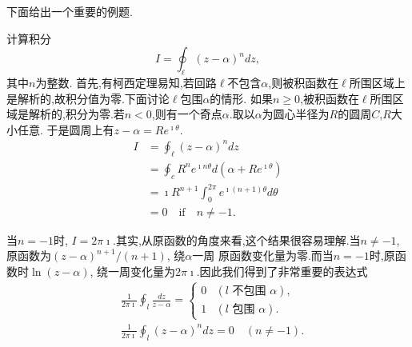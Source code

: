 下面给出一个重要的例题.
\begin{examplebox}{计算积分\[ I = \oint_\ell (z-\alpha)^n dz, \]其中$n$为整数.}
首先,有柯西定理易知,若回路$\ell$不包含$\alpha$,则被积函数在$\ell$所围区域上是解析的,故积分值为零.下面讨论$\ell$包围$\alpha$的情形.
如果$n\geq 0$,被积函数在$\ell$所围区域是解析的,积分为零.若$n<0$,则有一个奇点$\alpha$.取以$\alpha$为圆心半径为$R$的圆周$C$,$R$大小任意.
于是圆周上有$z-\alpha = Re^{\imath \theta}$.
$$
\begin{aligned}
    I &= \oint_\ell (z-\alpha)^n dz\\
     &= \oint_c R^n e^{\imath n \theta} d (\alpha + R e^{\imath \theta})\\
     & =  \imath R^{n+1} \int_0^{2\pi} e^{\imath (n+1)\theta}  d\theta \\
     & = 0 \quad \textrm{if} \quad n\neq -1.
\end{aligned}
$$

当$n = -1$时, $I = 2\pi \imath$.其实,从原函数的角度来看,这个结果很容易理解.当$n\neq -1$,原函数为$(z-\alpha)^{n+1}/(n+1)$, 绕$\alpha$一周
原函数变化量为零.而当$n=-1$时,原函数时$\ln(z-\alpha)$, 绕一周变化量为$2\pi \imath$.因此我们得到了非常重要的表达式
$$
    \begin{aligned}
        & \frac{1}{2 \pi \imath} \oint_l \frac{d z}{z-\alpha}= \begin{cases}0 & (l \text { 不包围 } \alpha), \\
        1 & (l \text { 包围 } \alpha) . \end{cases} \\
        & \frac{1}{2 \pi \imath} \oint_l(z-\alpha)^n d z=0 \quad(n \neq-1) .
        \end{aligned}
$$
\end{examplebox}